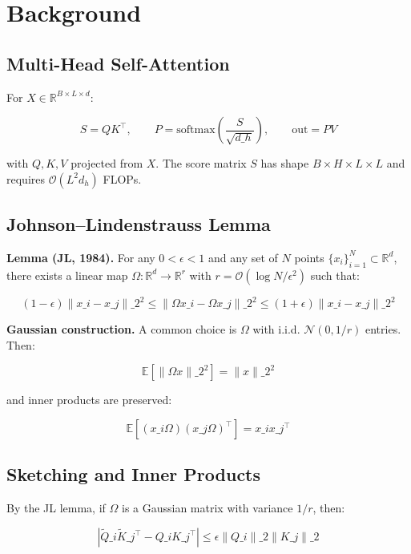 
\section{Background}

\subsection{Multi-Head Self-Attention}

For $X \in \mathbb{R}^{B \times L \times d}$:

\[
S = Q K^\top, \qquad
P = \text{softmax}\!\left(\frac{S}{\sqrt{d\_h}}\right), \qquad
\text{out} = P V
\tag{3.1}
\]

with $Q, K, V$ projected from $X$. The score matrix $S$ has shape 
$B \times H \times L \times L$ and requires $\mathcal{O}(L^2 d_h)$ FLOPs.

\subsection{Johnson--Lindenstrauss Lemma}

\textbf{Lemma (JL, 1984).} For any $0 < \epsilon < 1$ and any set of $N$ points 
$\{x_i\}_{i=1}^N \subset \mathbb{R}^d$, there exists a linear map 
$\Omega : \mathbb{R}^d \to \mathbb{R}^r$ with 
$r = \mathcal{O}(\log N / \epsilon^2)$ such that:

\[
(1 - \epsilon) \|x\_i - x\_j\|\_2^2 \leq \|\Omega x\_i - \Omega x\_j\|\_2^2 \leq (1 + \epsilon) \|x\_i - x\_j\|\_2^2
\tag{3.2}
\]

\textbf{Gaussian construction.} A common choice is $\Omega$ with i.i.d. 
$\mathcal{N}(0, 1/r)$ entries. Then:

\[
\mathbb{E}[\|\Omega x\|\_2^2] = \|x\|\_2^2
\tag{3.3}
\]

and inner products are preserved:

\[
\mathbb{E}[(x\_i \Omega)(x\_j \Omega)^\top] = x\_i x\_j^\top
\tag{3.4}
\]

\subsection{Sketching and Inner Products}

By the JL lemma, if $\Omega$ is a Gaussian matrix with variance $1/r$, then:

\[
|\tilde{Q}\_i \tilde{K}\_j^\top - Q\_i K\_j^\top| \leq \epsilon \|Q\_i\|\_2 \|K\_j\|\_2
\tag{3.5}
\]

